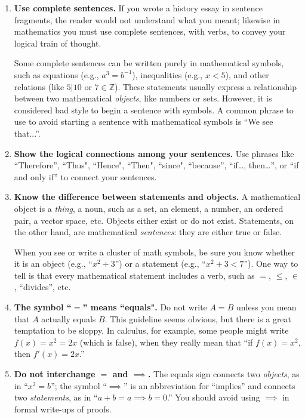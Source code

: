 \begin{enumerate}
\item \textbf{Use complete sentences.}
If you wrote a history essay in sentence fragments, the reader would not understand what you meant; likewise in mathematics you must use complete sentences, with verbs, to convey your logical train of thought.
        
Some complete sentences can be written purely in mathematical symbols, such as equations (e.g., $a^3=b^{-1}$), inequalities (e.g., $x<5$), and other relations (like $5\big|10$ or $7\in\mathbb{Z}$). These statements usually express a relationship between two mathematical \emph{objects}, like numbers or sets.  However, it is considered bad style to begin a sentence with symbols.  A common phrase to use to avoid starting a sentence with mathematical symbols is ``We see that...''.

\item \textbf{Show the logical connections among your sentences.}
Use phrases like ``Therefore'', ``Thus", ``Hence", ``Then", ``since", ``because'', ``if\ldots, then\ldots'', or ``if and only if'' to connect your sentences.
  
\item \textbf{Know the difference between statements and objects.}
A mathematical object is a \emph{thing}, a noun, such as a set, an element, a number, an ordered pair, a vector space, etc. Objects either exist or do not exist. Statements, on the other hand, are mathematical \emph{sentences}:  they are either true or false.
        
When you see or write a cluster of math symbols, be sure you know whether it is an object (e.g., ``$x^2+3$'') or a statement (e.g., ``$x^2+3<7$''). One way to tell is that every mathematical statement includes a verb, such as $=$, $\leq$, $\in$, ``divides'', etc.
        
\item \textbf{The symbol ``$=$'' means ``equals".}
Do not write $A=B$ unless you mean that $A$ actually equals $B$. This guideline seems obvious, but there is a great temptation to be sloppy.  In calculus, for example, some people might write $f(x)=x^{2}=2x$ (which is false), when they really mean that ``if $f(x)=x^{2}$, then $f'(x)=2x$.''

\item \textbf{Do not interchange ${=}$ and ${\implies}$.}
The equals sign connects two \emph{objects}, as in ``$x^2=b$''; the symbol ``$\implies$'' is an abbreviation for ``implies'' and connects two \emph{statements}, as in ``$a+b=a \implies b=0$.''  You should avoid using $\implies$ in formal write-ups of proofs.


\end{enumerate}
